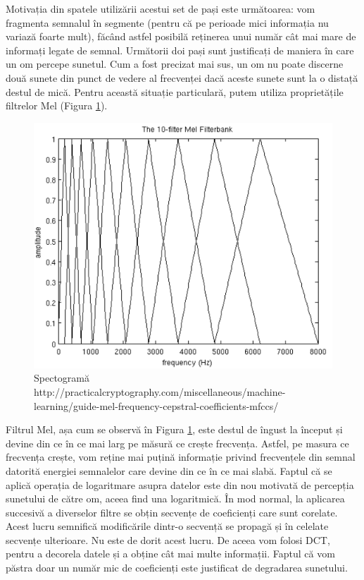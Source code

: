 \documentclass[a4paper,12pt]{report}
\begin{document}
 	Motivația din spatele utilizării acestui set de pași este următoarea: vom fragmenta semnalul în segmente (pentru că pe perioade mici informația nu variază foarte mult), făcând astfel posibilă reținerea unui număr cât mai mare de informați legate de semnal. Următorii doi pași sunt justificați de maniera în care un om percepe sunetul. Cum a fost precizat mai sus, un om nu poate discerne două sunete din punct de vedere al frecvenței dacă aceste sunete sunt la o distață destul de mică. Pentru această situație particulară, putem utiliza proprietățile filtrelor Mel (Figura \ref{fig:mel_scale}). 
	
	\begin{figure}[H]
		\begin{center}
			\includegraphics[scale=0.3]{images/mel_filterbank.PNG}
		\end{center}
		\caption{Spectogramă \newline
			\hspace{\linewidth}http://practicalcryptography.com/miscellaneous/machine-learning/guide-mel-frequency-cepstral-coefficients-mfccs/}
		\label{fig:mel_scale}
	\end{figure}
	
	Filtrul Mel, așa cum se observă în Figura \ref{fig:mel_scale}, este destul de îngust la început și devine din ce în ce mai larg pe măsură ce crește frecvența. Astfel, pe masura ce frecvența crește, vom reține mai puțină informație privind frecvențele din semnal datorită energiei semnalelor care devine din ce în ce mai slabă. Faptul că se aplică operația de logaritmare asupra datelor este din nou motivată de percepția sunetului de către om, aceea find una logaritmică. În mod normal, la aplicarea succesivă a diverselor filtre se obțin secvențe de coeficienți care sunt corelate. Acest lucru semnifică modificările dintr-o secvență se propagă și în celelate secvențe ulterioare. Nu este de dorit acest lucru. De aceea vom folosi DCT, pentru a decorela datele și a obține cât mai multe informații. Faptul că vom păstra doar un număr mic de coeficienți este justificat de degradarea sunetului.
	
\end{document}
